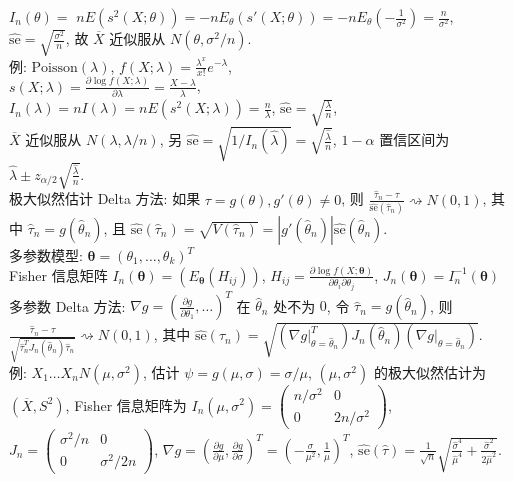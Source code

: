 \documentclass[titlepage, a4paper, landscape]{article}
\begin{document}
\begin{multicols}{4}
$I_n(\theta) = $ $n E(s^2(X; \theta)) = -n E_\theta(s'(X; \theta)) = -n E_\theta(-\frac 1 {\sigma^2}) = \frac {n} {\sigma^2}$,
$\hat {\mathrm{se}} = \sqrt{\frac{\sigma^2}{n}}$, 故 $\overline X$ 近似服从 $N(\theta, \sigma^2 / n)$. \\
例: $\mathrm{Poisson}(\lambda)$,
$f(X; \lambda) = \frac{\lambda^x}{x!} e^{-\lambda}$,\\
$s(X; \lambda) = \frac{\partial \log f(X; \lambda)}{\partial \lambda} = \frac{X - \lambda}{\lambda}$,\\
$I_n(\lambda) = n I(\lambda) = n E(s^2(X; \lambda)) = \frac{n}{\lambda}$, $\hat {\mathrm{se}} = \sqrt{\frac{\lambda}{n}}$, \\
$\overline X$ 近似服从 $N(\lambda, \lambda / n)$,
另 $\hat{\mathrm{se}} = \sqrt{1 / I_n (\hat \lambda)} = \sqrt{\frac {\hat \lambda} {n}}$, $1 - \alpha$ 置信区间为 $\hat \lambda \pm z_{\alpha/2} \sqrt{\frac {\hat \lambda} {n}}$. \\

\newcolumn
极大似然估计 Delta 方法: 如果 $\tau = g(\theta), g'(\theta) \neq 0$, 则 $\frac {\hat \tau_n - \tau} {\hat {\mathrm{se}}(\hat \tau_n)} \rightsquigarrow N(0, 1)$,
其中 $\hat \tau_n = g(\hat \theta_n)$, 且 $\hat {\mathrm{se}}(\hat \tau_n) = \sqrt{V(\hat \tau_n)} = |g'(\hat \theta_n)| \hat {\mathrm{se}}(\hat \theta_n)$. \\
多参数模型: $\mathbf{\theta} = (\theta_1, \dots, \theta_k)^T$ \\
Fisher 信息矩阵 $I_n(\mathbf{\theta}) = (E_{\mathbf{\theta}}(H_{ij}))$,
$ H_{ij} = \frac{\partial \log f(X; \mathbf{\theta})}{\partial \theta_i \partial \theta_j}$,
$J_n(\mathbf{\theta}) = I_n^{-1}(\mathbf{\theta})$\\
多参数 Delta 方法: $\nabla g = (\frac{\partial g}{\partial \theta_1}, \dots)^T$ 在 $\hat \theta_n$ 处不为 $0$, 令 $\hat \tau_n = g(\hat \theta_n)$, 则
$\frac {\hat \tau_n - \tau} {\sqrt{\hat \tau_n^T J_n(\hat \theta_n) \hat \tau_n}} \rightsquigarrow N(0, 1)$,
其中 $\hat {\mathrm{se}}(\hat \tau_n) = \sqrt{(\nabla g |_{\theta = \hat \theta_n}^T) J_n(\hat \theta_n) (\nabla g |_{\theta = \hat \theta_n})}$. \\
例: $X_1\dots X_n N(\mu, \sigma^2)$, 估计 $\psi = g(\mu, \sigma) = \sigma / \mu$,
$(\mu, \sigma ^ 2)$ 的极大似然估计为 $(\overline X, S^2)$,
Fisher 信息矩阵为 $I_n(\mu, \sigma^2) = \begin{pmatrix}
	n / \sigma^2 & 0 \\
	0 & 2n / \sigma^2
\end{pmatrix}$,$J_n = \begin{pmatrix}
	\sigma^2 / n & 0 \\
	0 & \sigma^2 / 2n
\end{pmatrix}$, $\nabla g = (\frac{\partial g}{\partial \mu}, \frac{\partial g}{\partial \sigma})^T = (-\frac{\sigma}{\mu^2}, \frac{1}{\mu})^T$,
$\hat {\mathrm{se}}(\hat \tau) = \frac 1 {\sqrt n} \sqrt{\frac {\hat \sigma ^ 4} {\hat \mu^4} + \frac {\hat \sigma^2} {2 \hat \mu^2}}$. \\


\end{multicols}
\end{document}

